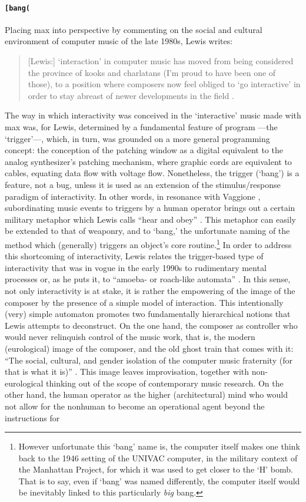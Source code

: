 \paragraph{\texttt{[bang(}}
Placing \gls{max} into perspective by commenting on the social and cultural environment of computer music of the late 1980s, Lewis writes:

\begin{quote}
	[Lewis:] `interaction' in computer music has moved from being considered the province of kooks and charlatans (I'm proud to have been one of those), to a position where composers now feel obliged to `go interactive' in order to stay abreast of newer developments in the field \parencite[11]{Lew93:Put}.
\end{quote}

The way in which interactivity was conceived in the `interactive' music made with \gls{max} was, for Lewis, determined by a fundamental feature of program ---the `trigger'---, which, in turn, was grounded on a more general programming concept: the conception of the patching window as a digital equivalent to the analog synthesizer's patching mechanism, where graphic cords are equivalent to cables, equating data flow with voltage flow. Nonetheless, the trigger (`bang') is a feature, not a bug, unless it is used as an extension of the stimulus/response paradigm of interactivity. In other words, in resonance with Vaggione , subordinating music events to triggers by a human operator brings out a certain military metaphor which Lewis calls ``hear and obey'' \parencite[11]{Lew93:Put}. This metaphor can easily be extended to that of weaponry, and to `bang,' the unfortunate naming of the method which (generally) triggers an object's core routine.\footnote{However unfortunate this `bang' name is, the computer itself makes one think back to the 1946 setting of the UNIVAC computer, in the military context of the Manhattan Project, for which it was used to get closer to the `H' bomb. That is to say, even if `bang' was named differently, the computer itself would be inevitably linked to this particularly \textit{big} bang.} In order to address this shortcoming of interactivity, Lewis relates the trigger-based type of interactivity that was in vogue in the early 1990s to rudimentary mental processes or, as he puts it, to ``amoeba- or roach-like automata'' \parencite[11]{Lew93:Put}. In this sense, not only interactivity is at stake, it is rather the empowering of the image of the composer by the presence of a simple model of interaction. This intentionally (very) simple automaton promotes two fundamentally hierarchical notions that Lewis attempts to deconstruct. On the one hand, the composer as controller who would never relinquish control of the music work, that is, the modern (eurological) image of the composer, and the old ghost train that comes with it: ``The social, cultural, and gender isolation of the computer music fraternity (for that is what it is)'' \parencite[11]{Lew93:Put}. This image leaves improvisation, together with non-eurological thinking out of the scope of contemporary music research. On the other hand, the human operator as the higher (architectural) mind who would not allow for the nonhuman to become an operational agent beyond the instructions for 